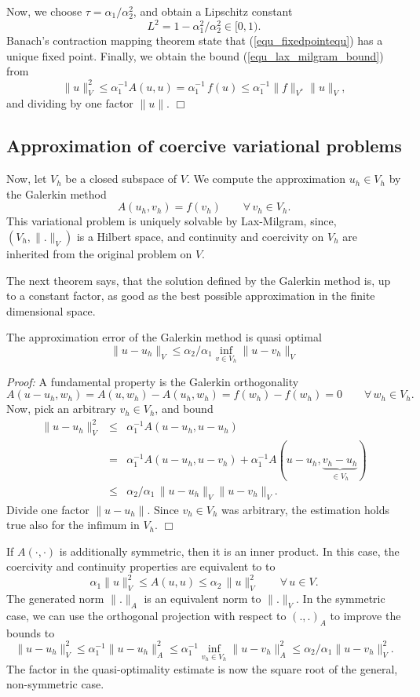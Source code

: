 Now, we choose $\tau = \alpha_1 / \alpha_2^2$, and obtain a Lipschitz constant
$$
L^2 = 1 - \alpha_1^2 / \alpha_2^2 \in [0,1).
$$
Banach's contraction mapping theorem state that (\ref{equ_fixedpointequ}) 
has a unique fixed point. Finally, we obtain the bound (\ref{equ_lax_milgram_bound}) from
$$
\| u \|_V^2 \leq \alpha_1^{-1} A(u,u) = \alpha_1^{-1} \, f(u) \leq \alpha_1^{-1} \| f\|_{V^\ast} \| u \|_V,
$$
and dividing by one factor $\|u\|$.
\hfill $\Box$

\subsection{Approximation of coercive variational problems}
Now, let $V_h$ be a closed subspace of $V$. We compute the
approximation $u_h \in V_h$ by the Galerkin method
\begin{equation}
A(u_h, v_h) = f(v_h) \qquad \forall \, v_h \in V_h.
\end{equation}
This variational problem is uniquely solvable by Lax-Milgram, 
since, $(V_h,\|.\|_V)$ is 
a Hilbert space, and continuity and coercivity on $V_h$ are inherited
from the original problem on $V$.


The next theorem says, that the solution defined by the Galerkin method is,
up to a constant factor, as good as the best possible approximation in the
finite dimensional space.

\begin{theorem}[Cea] The approximation error of the Galerkin method
is quasi optimal
$$
\| u - u_h \|_V \leq \alpha_2 / \alpha_1 \inf_{v \in V_h} \| u - v_h \|_V
$$
\end{theorem}
{\em Proof:} A fundamental property is the Galerkin orthogonality
$$
A(u-u_h, w_h) = A(u,w_h) - A(u_h, w_h) = f(w_h) - f(w_h) = 0
\qquad \forall \, w_h \in V_h.
$$
Now, pick an arbitrary $v_h \in V_h$, and bound
\begin{eqnarray*}
\| u - u_h \|_V^2 & \leq & \alpha_1^{-1} A(u-u_h, u-u_h) \\
& = & \alpha_1^{-1} A(u-u_h, u-v_h) + \alpha_1^{-1} A(u-u_h, \underbrace{v_h-u_h}_{\in V_h}) \\
& \leq &  \alpha_2 / \alpha_1 \, \| u - u_h \|_V \| u - v_h \|_V.
\end{eqnarray*}
Divide one factor $\|u - u_h\|$. Since $v_h \in V_h$ was arbitrary, the estimation
holds true also for the infimum in $V_h$.
\hfill $\Box$

\bigskip
If $A(\cdot,\cdot)$ is additionally symmetric, then it is an inner product. In this
case, the coercivity and continuity properties are equivalent to
to
$$
\alpha_1 \| u \|_V^2 \leq A(u,u) \leq \alpha_2 \, \| u \|_V^2
\qquad \forall \, u \in V.
$$
The generated norm $\|.\|_A$ is an equivalent norm to $\|.\|_V$. In the 
symmetric case, we can use the orthogonal projection with respect to 
$(.,.)_A$ to improve the bounds to
$$
\| u - u_h \|_V^2 \leq \alpha_1^{-1} \| u - u_h \|_A^2 \leq
        \alpha_1^{-1} \inf_{v_h \in V_h} \| u - v_h \|_A^2 \leq
        \alpha_2 / \alpha_1 \| u - v_h \|_V^2.
$$
The factor in the quasi-optimality estimate is now the square root of the
general, non-symmetric case.

